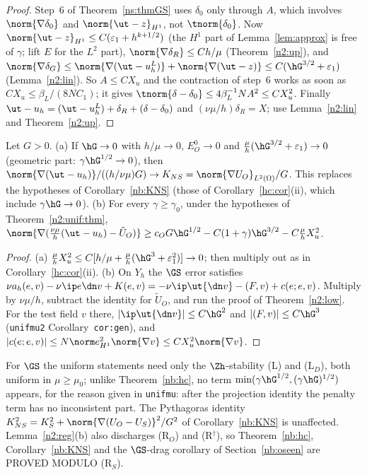 \begin{proof}
Step~6 of Theorem~\ref{ns:thmGS} uses $\delta_0$ only through $A$, which involves $\norm{\nabla\delta_0}$ and $\norm{\ut-z}_{H^1}$, not $\tnorm{\delta_0}$.
Now $\norm{\ut-z}_{H^1}\le C(\varepsilon_1+h^{k+1/2})$ (the $H^1$ part of Lemma~\ref{lem:approx} is free of $\gamma$; lift $E$ for the $L^2$ part),
$\norm{\nabla\delta_R}\le Ch/\mu$ (Theorem~\ref{n2:up}), and $\norm{\nabla\delta_G}\le\norm{\nabla(\ut-u^L_h)}+\norm{\nabla(\ut-z)}\le C(\hG^{3/2}+\varepsilon_1)$
(Lemma~\ref{n2:lin}). So $A\le CX_u$ and the contraction of step~6 works as soon as $CX_u\le\beta_L/(8NC_1)$; it gives $\tnorm{\delta-\delta_0}\le4\beta_L^{-1}NA^2\le CX_u^2$.
Finally $\ut-u_h=(\ut-u^L_h)+\delta_R+(\delta-\delta_0)$ and $(\nu\mu/h)\delta_R=X$; use Lemma~\ref{n2:lin} and Theorem~\ref{n2:up}.
\end{proof}

\begin{corollary}\label{n2:gen}
Let $G>0$. (a) If $\hG\to0$ with $h/\mu\to0$, $E^0_O\to0$ and $\frac\mu h(\hG^{3/2}+\varepsilon_1)\to0$ (geometric part: $\gamma\hG^{1/2}\to0$), then
$\norm{\nabla(\ut-u_h)}/((h/\nu\mu)G)\to K_{NS}=\norm{\nabla U_O}_{L^2(\Omega)}/G$. This replaces the hypotheses of Corollary~\ref{nb:KNS}
(those of Corollary~\ref{hc:cor}(ii), which include $\gamma\hG\to0$).
(b) For every $\gamma\ge\gamma_0$, under the hypotheses of Theorem~\ref{n2:unif:thm},
$\norm{\nabla(\frac{\nu\mu}h(\ut-u_h)-\tilde U_O)}\ge c_OG\hG^{1/2}-C(1+\gamma)\hG^{3/2}-C\frac\mu hX_u^2$.
\end{corollary}

\begin{proof}
(a) $\frac\mu hX_u^2\le C[h/\mu+\frac\mu h(\hG^3+\varepsilon_1^2)]\to0$; then multiply out as in Corollary~\ref{hc:cor}(ii).
(b) On $Y_h$ the $\GS$ error satisfies $\nu a_h(e,v)-\nu\ip e{\dn v}+K(e,v)=-\nu\ip\ut{\dn v}-(F,v)+c(e;e,v)$. Multiply by $\nu\mu/h$, subtract the
identity for $\tilde U_O$, and run the proof of Theorem~\ref{n2:low}. For the test field $v$ there, $|\ip\ut{\dn v}|\le C\hG^2$ and
$|(F,v)|\le C\hG^3$ (\texttt{unifmu2} Corollary~\texttt{cor:gen}), and $|c(e;e,v)|\le N\norm e^2_{H^1}\norm{\nabla v}\le CX_u^2\norm{\nabla v}$.
\end{proof}

\begin{remark}
For $\GS$ the uniform statements need only the $\Zh$-stability (L) and (L$_D$), both uniform in $\mu\ge\mu_0$; unlike Theorem~\ref{nb:hc}, no
term $\min(\gamma\hG^{1/2},(\gamma\hG)^{1/2})$ appears, for the reason given in \texttt{unifmu}: after the projection identity the penalty term has
no inconsistent part. The Pythagoras identity $K_{NS}^2=K_S^2+\norm{\nabla(U_O-U_S)}^2/G^2$ of Corollary~\ref{nb:KNS} is unaffected. Lemma~\ref{n2:reg}(b)
also discharges (R$_O$) and (R$^\dagger$), so Theorem~\ref{nb:hc}, Corollary~\ref{nb:KNS} and the $\GS$-drag corollary of Section~\ref{nb:oseen}
are PROVED MODULO (R$_S$).
\end{remark}

